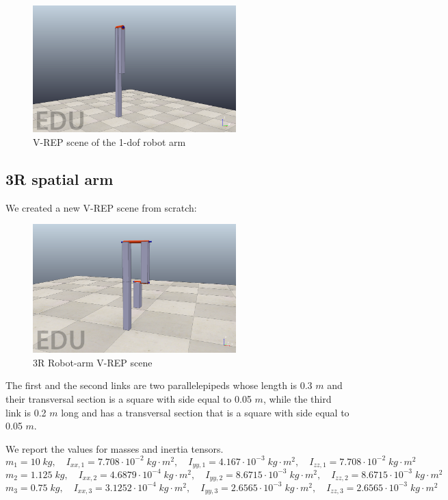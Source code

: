 \documentclass{article}
\begin{document}
\begin{figure}[!htbp]
\centering
\includegraphics[width=0.7\textwidth]{images/1-dof/scene.png}
\caption{V-REP scene of the 1-dof robot arm}
\end{figure}
\FloatBarrier

\subsection{3R spatial arm} We created a new V-REP scene from scratch:
\FloatBarrier
\begin{figure}[!htbp]
\centering
\includegraphics[width=0.7\textwidth]{images/3-dof/scene.png}
\caption{3R Robot-arm V-REP scene}
\end{figure}
\FloatBarrier

The first and the second links are two parallelepipeds whose length is 0.3 $m$ and their transversal section is a square with side equal to 0.05 $m$, while the third link is 0.2 $m$ long and has a transversal section that is a square with side equal to 0.05 $m$.

We report the  values for masses and inertia tensors.
\[m_1 = 10 \;kg,\quad I_{xx,1} = 7.708\cdot 10^{-2}\;kg\cdot m^2,\quad I_{yy,1} = 4.167 \cdot 10^{-3}\;kg\cdot m^2,\quad I_{zz,1} = 7.708\cdot 10^{-2}\;kg\cdot m^2\]
\[ m_2 = 1.125\;kg,\quad I_{xx,2} = 4.6879\cdot10^{-4}\;kg\cdot m^2,\quad I_{yy,2} = 8.6715\cdot 10^{-3}\;kg\cdot m^2,\quad I_{zz,2} = 8.6715\cdot 10^{-3}\;kg\cdot m^2\]
\[m_3 = 0.75\;kg,\quad I_{xx,3} = 3.1252\cdot 10^{-4}\;kg\cdot m^2,\quad I_{yy,3} = 2.6565\cdot 10^{-3}\;kg\cdot m^2,\quad I_{zz,3} = 2.6565\cdot 10^{-3}\;kg\cdot m^2\]
\end{document}
